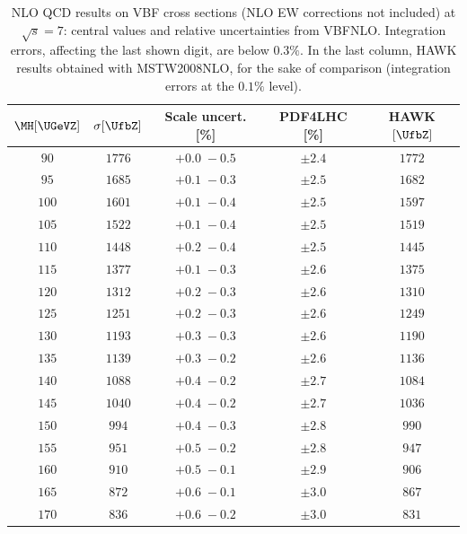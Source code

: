 \begin{table}
  \caption{NLO QCD results on VBF cross sections (NLO EW corrections not included) at $\sqrt{s} =
  7$\UTeV: central values  and relative uncertainties  from
  {\sc VBFNLO}. Integration errors, affecting the last shown digit, are below
  $0.3\%$. In the last column, {\sc HAWK} results obtained with MSTW2008NLO,
  for the sake of comparison (integration errors at the $0.1\%$ level).}
  \centering
  \small
  \begin{tabular}{ccccc}\hline
$\MH [\UGeVZ]$ & $\sigma[\UfbZ]$ & Scale uncert. [\%] & PDF4LHC [\%] & {\sc HAWK}$[\UfbZ]$ \\  
\hline
$90  $&$ 1776 $&$ +0.0 \; -\!0.5 $&$ \pm 2.4 $&$ 1772  $ \\
$95  $&$ 1685 $&$ +0.1 \; -\!0.3 $&$ \pm 2.5 $&$ 1682  $ \\
$100 $&$ 1601 $&$ +0.1 \; -\!0.4 $&$ \pm 2.5 $&$ 1597  $ \\
$105 $&$ 1522 $&$ +0.1 \; -\!0.4 $&$ \pm 2.5 $&$ 1519  $ \\
$110 $&$ 1448 $&$ +0.2 \; -\!0.4 $&$ \pm 2.5 $&$ 1445  $ \\
$115 $&$ 1377 $&$ +0.1 \; -\!0.3 $&$ \pm 2.6 $&$ 1375  $ \\
$120 $&$ 1312 $&$ +0.2 \; -\!0.3 $&$ \pm 2.6 $&$ 1310  $ \\
$125 $&$ 1251 $&$ +0.2 \; -\!0.3 $&$ \pm 2.6 $&$ 1249  $ \\
$130 $&$ 1193 $&$ +0.3 \; -\!0.3 $&$ \pm 2.6 $&$ 1190  $ \\
$135 $&$ 1139 $&$ +0.3 \; -\!0.2 $&$ \pm 2.6 $&$ 1136  $ \\
$140 $&$ 1088 $&$ +0.4 \; -\!0.2 $&$ \pm 2.7 $&$ 1084  $ \\
$145 $&$ 1040 $&$ +0.4 \; -\!0.2 $&$ \pm 2.7 $&$ 1036  $ \\
$150 $&$  994 $&$ +0.4 \; -\!0.3 $&$ \pm 2.8 $&$ 990   $ \\
$155 $&$  951 $&$ +0.5 \; -\!0.2 $&$ \pm 2.8 $&$ 947   $ \\
$160 $&$  910 $&$ +0.5 \; -\!0.1 $&$ \pm 2.9 $&$ 906   $ \\
$165 $&$  872 $&$ +0.6 \; -\!0.1 $&$ \pm 3.0 $&$ 867   $ \\
$170 $&$  836 $&$ +0.6 \; -\!0.2 $&$ \pm 3.0 $&$ 831   $ \\

\end{tabular}
\end{table}
